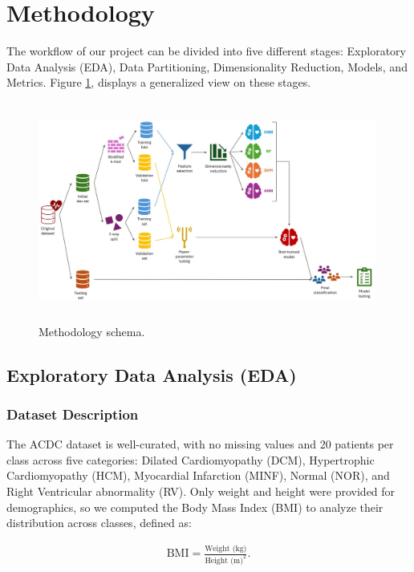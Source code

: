 \section{Methodology}

The workflow of our project can be divided into five different stages:
Exploratory Data Analysis (EDA), Data Partitioning, Dimensionality Reduction,
Models, and Metrics. Figure \ref{fig:fig1}, displays a generalized view on
these stages.

\begin{figure}[H]
	\begin{center}
		\includegraphics[width=0.99\textwidth, height=7.2cm]{../images/schemas/workflow_01.jpeg}
	\end{center}
	\caption{Methodology schema.}
	\label{fig:fig1}
\end{figure}

\subsection{Exploratory Data Analysis (EDA)}

\subsubsection{Dataset Description}

The ACDC dataset is well-curated, with no missing values and 20 patients per
class across five categories: Dilated Cardiomyopathy (DCM), Hypertrophic
Cardiomyopathy (HCM), Myocardial Infarction (MINF), Normal (NOR), and Right
Ventricular abnormality (RV). Only weight and height were provided for
demographics, so we computed the Body Mass Index (BMI) to analyze their
distribution across classes, defined as:

\begin{align}
	\text{BMI} = \frac{\text{Weight (kg)}}{\text{Height (m)}^2}.
\end{align}

